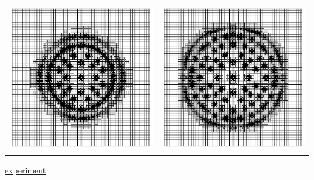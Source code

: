 \documentclass[compress,12pt]{beamer}
\begin{document}
\begin{frame}
{\begin{center}
\begin{tabular}{cc}
	  \includegraphics[height=.4\textheight]{figures/mesh0022} &
	  \includegraphics[height=.4\textheight]{figures/mesh0028} \\
	\end{tabular}
      \end{center}
      \footnotesize
      \href{movies/plate_pattern_3.avi}{experiment}
    }
\end{frame}
\end{document}

